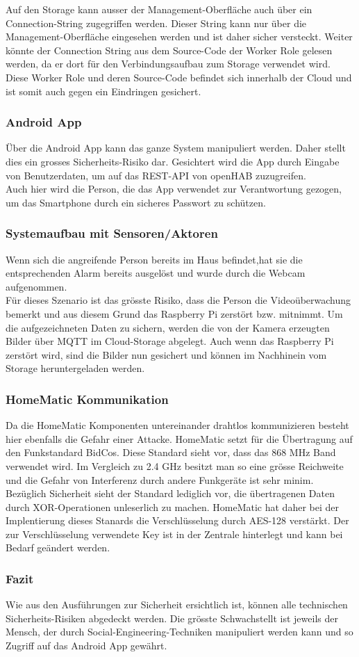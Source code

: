 Auf den Storage kann ausser der Management-Oberfläche auch über ein Connection-String zugegriffen werden. Dieser String kann nur über die Management-Oberfläche eingesehen werden und ist daher sicher versteckt. Weiter könnte der Connection String aus dem Source-Code der Worker Role gelesen werden, da er dort für den Verbindungsaufbau zum Storage verwendet wird. Diese Worker Role und deren Source-Code befindet sich innerhalb der Cloud und ist somit auch gegen ein Eindringen gesichert. \\

\subsubsection{Android App}
Über die Android App kann das ganze System manipuliert werden. Daher stellt dies ein grosses Sicherheits-Risiko dar. Gesichtert wird die App durch Eingabe von Benutzerdaten, um auf das REST-API von openHAB zuzugreifen. \\
Auch hier wird die Person, die das App verwendet zur Verantwortung gezogen, um das Smartphone durch ein sicheres Passwort zu schützen.

\subsubsection{Systemaufbau mit Sensoren/Aktoren}
Wenn sich die angreifende Person bereits im Haus befindet,hat sie die entsprechenden Alarm bereits ausgelöst und wurde durch die Webcam aufgenommen. \\
Für dieses Szenario ist das grösste Risiko, dass die Person die Videoüberwachung bemerkt und aus diesem Grund das Raspberry Pi zerstört bzw. mitnimmt. Um die aufgezeichneten Daten zu sichern, werden die von der Kamera erzeugten Bilder über MQTT im Cloud-Storage abgelegt. Auch wenn das Raspberry Pi zerstört wird, sind die Bilder nun gesichert und können im Nachhinein vom Storage heruntergeladen werden.

\subsubsection{HomeMatic Kommunikation}
Da die HomeMatic Komponenten untereinander drahtlos kommunizieren besteht hier ebenfalls die Gefahr einer Attacke. HomeMatic setzt für die Übertragung auf den Funkstandard BidCos. Diese Standard sieht vor, dass das 868 MHz Band verwendet wird. Im Vergleich zu 2.4 GHz besitzt man so eine grösse Reichweite und die Gefahr von Interferenz durch andere Funkgeräte ist sehr minim.\\
Bezüglich Sicherheit sieht der Standard lediglich vor, die übertragenen Daten durch XOR-Operationen unleserlich zu machen. HomeMatic hat daher bei der Implentierung dieses Stanards die Verschlüsselung durch AES-128 verstärkt. Der zur Verschlüsselung verwendete Key ist in der Zentrale hinterlegt und kann bei Bedarf geändert werden.


\subsubsection{Fazit}
Wie aus den Ausführungen zur Sicherheit ersichtlich ist, können alle technischen Sicherheits-Risiken abgedeckt werden. Die grösste Schwachstellt ist jeweils der Mensch, der durch Social-Engineering-Techniken manipuliert werden kann und so Zugriff auf das Android App gewährt.